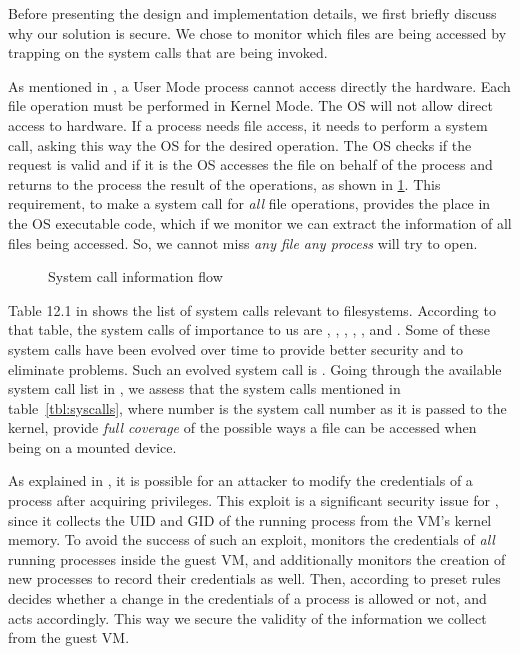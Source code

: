 \par Before presenting the design and implementation details, we first briefly discuss why our solution is secure. We chose to monitor which files are being accessed by trapping on the system calls that are being invoked. 

\par As mentioned in \cite{linuxkernel}, a User Mode process cannot access directly the hardware. Each file operation must be performed in Kernel Mode. The \ac{OS} will not allow direct access to hardware. If a process needs file access, it needs to perform a system call, asking this way the \ac{OS} for the desired operation. The \ac{OS} checks if the request is valid and if it is the \ac{OS} accesses the file on behalf of the process and returns to the process the result of the operations, as shown in \ref{fig:syscall}. This requirement, to make a system call for \emph{all} file operations, provides the place in the \ac{OS} executable code, which if we monitor we can extract the information of all files being accessed. So, we cannot miss \emph{any file any process} will try to open.

\begin{figure}[ht]
	\centering
	
	\caption{System call information flow}
	\label{fig:syscall}
\end{figure}

\par Table 12.1 in \cite{linuxkernel} shows the list of system calls relevant to filesystems. According to that table, the system calls of importance to us are , , , , , and . Some of these system calls have been evolved over time to provide better security and to eliminate problems. Such an evolved system call is . Going through the available system call list in , we assess that the system calls mentioned in table~\ref{tbl:syscalls}, where number is the system call number as it is passed to the kernel, provide \emph{full coverage} of the possible ways a file can be accessed when being on a mounted device. 

\par As explained in \cite{perla2010guide}, it is possible for an attacker to modify the credentials of a process after acquiring  privileges. This exploit is a significant security issue for , since it collects the \ac{UID} and \ac{GID} of the running process from the \ac{VM}'s kernel memory. To avoid the success of such an exploit,  monitors the credentials of \emph{all} running processes inside the guest \ac{VM}, and additionally monitors the creation of new processes to record their credentials as well. Then, according to preset rules  decides whether a change in the credentials of a process is allowed or not, and acts accordingly. This way we secure the validity of the information we collect from the guest \ac{VM}.


